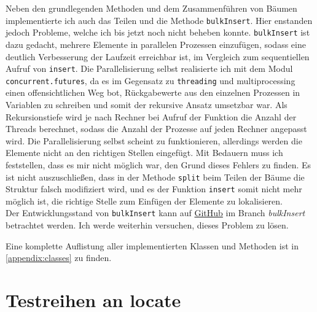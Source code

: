 Neben den grundlegenden Methoden und dem Zusammenführen von Bäumen implementierte ich auch das Teilen und die Methode \texttt{bulkInsert}. Hier enstanden jedoch Probleme, welche ich bis jetzt noch nicht beheben konnte. \texttt{bulkInsert} ist dazu gedacht, mehrere Elemente in parallelen Prozessen einzufügen, sodass eine deutlich Verbesserung der Laufzeit erreichbar ist, im Vergleich zum sequentiellen Aufruf von \texttt{insert}. Die Parallelisierung selbst realisierte ich mit dem Modul \texttt{concurrent.futures}, da es im Gegensatz zu \texttt{threading} und {multiprocessing} einen offensichtlichen Weg bot, Rückgabewerte aus den einzelnen Prozessen in Variablen zu schreiben und somit der rekursive Ansatz umsetzbar war. Als Rekursionstiefe wird je nach Rechner bei Aufruf der Funktion die Anzahl der Threads berechnet, sodass die Anzahl der Prozesse auf jeden Rechner angepasst wird. Die Parallelisierung selbst scheint zu funktionieren, allerdings werden die Elemente nicht an den richtigen Stellen eingefügt. Mit Bedauern muss ich feststellen, dass es mir nicht möglich war, den Grund dieses Fehlers zu finden. Es ist nicht auszuschließen, dass in der Methode \texttt{split} beim Teilen der Bäume die Struktur falsch modifiziert wird, und es der Funktion \texttt{insert} somit nicht mehr möglich ist, die richtige Stelle zum Einfügen der Elemente zu lokalisieren.
\\
Der Entwicklungsstand von \texttt{bulkInsert} kann auf \href{https://github.com/joshuajeschek/SortedSequences}{GitHub} im Branch \textit{bulkInsert} betrachtet werden. Ich werde weiterhin versuchen, dieses Problem zu lösen.
\par
Eine komplette Auflistung aller implementierten Klassen und Methoden ist in \autoref{appendix:classes} zu finden.

\section{Testreihen an locate}
\label{chapter:benchmarks}


